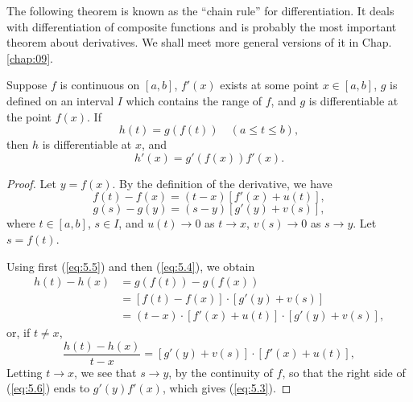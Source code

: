 The following theorem is known as the ``chain rule'' for differentiation.
It deals with differentiation of composite functions
and is probably the most important theorem about derivatives.
We shall meet more general versions of it in Chap. \ref{chap:09}.
\begin{thm}
    \label{thm:5.5}
    Suppose $f$ is continuous on $[a, b]$,
    $f'(x)$ exists at some point $x \in [a, b]$,
    $g$ is defined on an interval $I$ which contains the range of $f$,
    and $g$ is differentiable at the point $f(x)$. If
    \begin{equation*}
        h(t) = g(f(t))
        \quad
        (a \leq t \leq b),
    \end{equation*}
    then $h$ is differentiable at $x$, and
    \begin{equation}
        \label{eq:5.3}
        h'(x) = g'(f(x))f'(x).
    \end{equation}
\end{thm}

\begin{proof}
    Let $y = f(x)$. By the definition of the derivative, we have
    \begin{equation}
        \label{eq:5.4}
        f(t) - f(x) = (t - x) \left[ f'(x) + u(t) \right],
    \end{equation}
    \begin{equation}
        \label{eq:5.5}
        g(s) - g(y) = (s - y) \left[ g'(y) + v(s) \right],
    \end{equation}
    where $t \in [a, b]$, $s \in I$, and $u(t) \rightarrow 0$ as $t \rightarrow x$, $v(s) \rightarrow 0$ as $s \rightarrow y$.
    Let $s = f(t)$.

    Using first (\ref{eq:5.5}) and then (\ref{eq:5.4}), we obtain
    \begin{align*}
        h(t) - h(x)
         & = g(f(t)) - g(f(x))                                                          \\
         & = \left[ f(t) - f(x) \right] \cdot \left[ g'(y) + v(s) \right]               \\
         & = (t - x)\cdot \left[ f'(x) + u(t) \right]\cdot \left[ g'(y) + v(s) \right],
    \end{align*}
    or, if $t \neq x$,
    \begin{equation}
        \label{eq:5.6}
        \frac{h(t) - h(x)}{t - x} =
        \left[ g'(y) + v(s) \right]\cdot
        \left[ f'(x) + u(t) \right],
    \end{equation}
    Letting $t \rightarrow x$, we see that $s \rightarrow y$,
    by the continuity of $f$, so that the right side of (\ref{eq:5.6}) ends to $g'(y)f'(x)$, which gives (\ref{eq:5.3}).
\end{proof}


